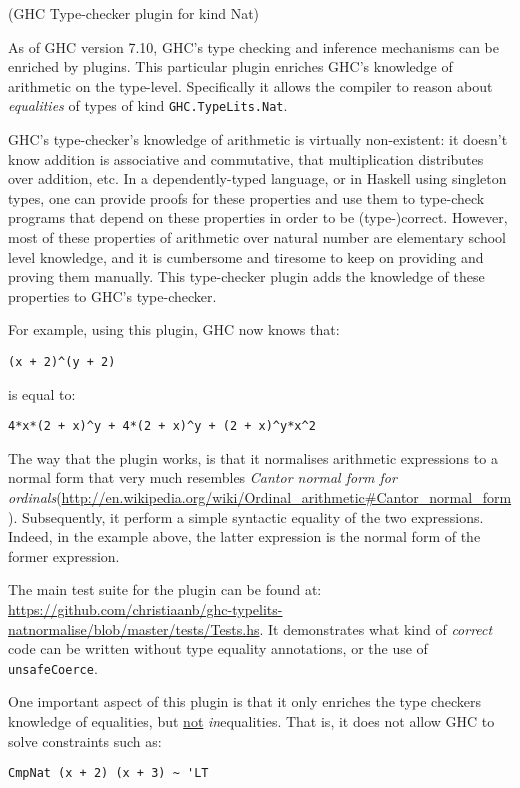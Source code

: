 \documentclass[DIV16,twocolumn,10pt]{scrreprt}
\begin{document}
\begin{hcarentry}{(GHC Type-checker plugin for kind Nat)}
\makeheader

As of GHC version 7.10, GHC's type checking and inference mechanisms can be enriched by plugins.
This particular plugin enriches GHC's knowledge of arithmetic on the type-level.
Specifically it allows the compiler to reason about \emph{equalities} of types of kind \verb!GHC.TypeLits.Nat!.

GHC's type-checker's knowledge of arithmetic is virtually non-existent: it doesn't know addition is associative and commutative, that multiplication distributes over addition, etc.
In a dependently-typed language, or in Haskell using singleton types, one can provide proofs for these properties and use them to type-check programs that depend on these properties in order to be (type-)correct.
However, most of these properties of arithmetic over natural number are elementary school level knowledge, and it is cumbersome and tiresome to keep on providing and proving them manually.
This type-checker plugin adds the knowledge of these properties to GHC's type-checker.

For example, using this plugin, GHC now knows that:
\begin{verbatim}
(x + 2)^(y + 2)
\end{verbatim}
is equal to:
\begin{verbatim}
4*x*(2 + x)^y + 4*(2 + x)^y + (2 + x)^y*x^2
\end{verbatim}

The way that the plugin works, is that it normalises arithmetic expressions to a normal form that very much resembles \emph{Cantor normal form for ordinals}(\url{http://en.wikipedia.org/wiki/Ordinal_arithmetic#Cantor_normal_form}).
Subsequently, it perform a simple syntactic equality of the two expressions.
Indeed, in the example above, the latter expression is the normal form of the former expression.

The main test suite for the plugin can be found at: \url{https://github.com/christiaanb/ghc-typelits-natnormalise/blob/master/tests/Tests.hs}.
It demonstrates what kind of \emph{correct} code can be written without type equality annotations, or the use of \verb!unsafeCoerce!.

One important aspect of this plugin is that it only enriches the type checkers knowledge of equalities, but \underline{not} \emph{in}equalities.
That is, it does not allow GHC to solve constraints such as:
\begin{verbatim}
CmpNat (x + 2) (x + 3) ~ 'LT
\end{verbatim}


\end{hcarentry}
\end{document}
